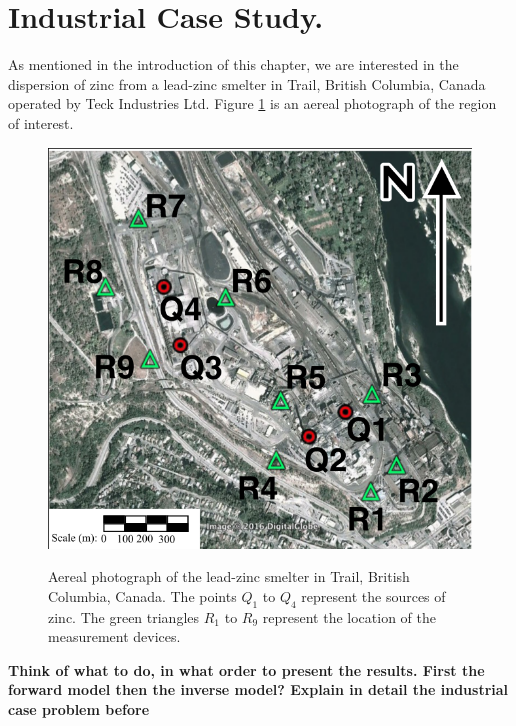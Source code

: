 \documentclass[12pt]{book}
\begin{document}
\section{Industrial Case Study.}
As mentioned in the introduction of this chapter, we are interested
in the dispersion of zinc from a lead-zinc smelter in Trail, British Columbia, Canada
operated by Teck Industries Ltd. Figure \ref{figAereal} is an aereal photograph of the region
of interest.
\begin{figure}[H]
\centering
\includegraphics[scale=0.5]{FigChap4/AerealView}
\label{figAereal}
\caption{Aereal photograph of the lead-zinc smelter in Trail, British Columbia, Canada. The points
$Q_{1}$ to $Q_{4}$ represent the sources of zinc. The green triangles $R_{1}$ to $R_{9}$ represent
the location of the measurement devices.}
\end{figure}

\textbf{Think of what to do, in what order to present the results. First the forward model then 
the inverse model? Explain in detail the industrial case problem before}



\end{document}
